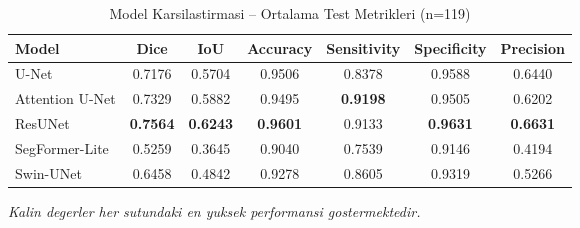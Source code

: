 
\begin{table}[h]
\centering
\caption{Model Karsilastirmasi -- Ortalama Test Metrikleri (n=119)}
\label{tab:model_comparison}
\begin{tabular}{lcccccc}
\toprule
\textbf{Model} & \textbf{Dice} & \textbf{IoU} & \textbf{Accuracy} & \textbf{Sensitivity} & \textbf{Specificity} & \textbf{Precision} \\
\midrule
U-Net & 0.7176 & 0.5704 & 0.9506 & 0.8378 & 0.9588 & 0.6440 \\
Attention U-Net & 0.7329 & 0.5882 & 0.9495 & \textbf{0.9198} & 0.9505 & 0.6202 \\
ResUNet & \textbf{0.7564} & \textbf{0.6243} & \textbf{0.9601} & 0.9133 & \textbf{0.9631} & \textbf{0.6631} \\
SegFormer-Lite & 0.5259 & 0.3645 & 0.9040 & 0.7539 & 0.9146 & 0.4194 \\
Swin-UNet & 0.6458 & 0.4842 & 0.9278 & 0.8605 & 0.9319 & 0.5266 \\
\bottomrule
\end{tabular}
\vspace{2pt}
\small\textit{Kalin degerler her sutundaki en yuksek performansi gostermektedir.}
\end{table}
